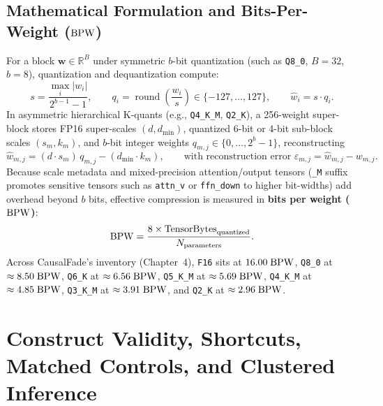 \subsection{Mathematical Formulation and Bits-Per-Weight (\texorpdfstring{$\mathrm{BPW}$}{BPW})}
For a block $\mathbf{w} \in \mathbb{R}^B$ under symmetric $b$-bit quantization (such as \texttt{Q8\_0}, $B=32$, $b=8$), quantization and dequantization compute:
\begin{equation}
  s = \frac{\max_i |w_i|}{2^{b-1}-1}, \qquad q_i = \operatorname{round}\!\left(\frac{w_i}{s}\right) \in \{-127,\dots,127\}, \qquad \widehat{w}_i = s \cdot q_i.
\end{equation}
In asymmetric hierarchical K-quants (e.g., \texttt{Q4\_K\_M}, \texttt{Q2\_K}), a 256-weight super-block stores FP16 super-scales $(d, d_{\min})$, quantized 6-bit or 4-bit sub-block scales $(s_m, k_m)$, and $b$-bit integer weights $q_{m,j} \in \{0,\dots,2^b-1\}$, reconstructing
\begin{equation}
  \widehat{w}_{m,j} = (d \cdot s_m)\, q_{m,j} - (d_{\min} \cdot k_m), \qquad \text{with reconstruction error } \varepsilon_{m,j} = \widehat{w}_{m,j} - w_{m,j}.
  \label{eq:kquant}
\end{equation}
Because scale metadata and mixed-precision attention/output tensors (\texttt{\_M} suffix promotes sensitive tensors such as \texttt{attn\_v} or \texttt{ffn\_down} to higher bit-widths) add overhead beyond $b$ bits, effective compression is measured in \textbf{bits per weight ($\mathrm{BPW}$)}:
\begin{equation}
  \mathrm{BPW} = \frac{8 \times \text{TensorBytes}_{\mathrm{quantized}}}{N_{\mathrm{parameters}}}.
\end{equation}
Across CausalFade's inventory (Chapter~4), \texttt{F16} sits at $16.00\;\mathrm{BPW}$, \texttt{Q8\_0} at $\approx 8.50\;\mathrm{BPW}$, \texttt{Q6\_K} at $\approx 6.56\;\mathrm{BPW}$, \texttt{Q5\_K\_M} at $\approx 5.69\;\mathrm{BPW}$, \texttt{Q4\_K\_M} at $\approx 4.85\;\mathrm{BPW}$, \texttt{Q3\_K\_M} at $\approx 3.91\;\mathrm{BPW}$, and \texttt{Q2\_K} at $\approx 2.96\;\mathrm{BPW}$.

\section{Construct Validity, Shortcuts, Matched Controls, and Clustered Inference}

